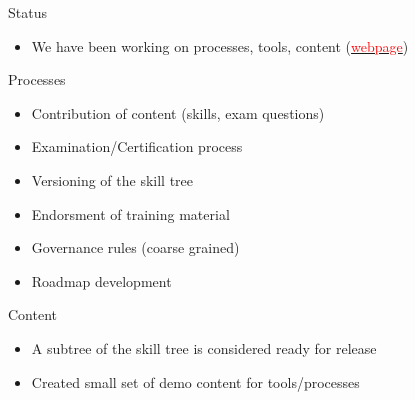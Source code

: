 \documentclass[compress,aspectratio=169]{beamer}
\newcommand{\hrefb}[2]{\href{#1}{\textcolor{red}{#2}}}
\begin{document}
\begin{frame}{Status}

  \begin{itemize}
    \item We have been working on processes, tools, content (\hrefb{https://www.hpc-certification.org/}{webpage})
  \end{itemize}


\begin{block}{Processes}
  \begin{itemize}
    \item Contribution of content (skills, exam questions)
    \item Examination/Certification process
    \item Versioning of the skill tree
    \item Endorsment of training material
    \item Governance rules (coarse grained)
    \item Roadmap development
  \end{itemize}
\end{block}


\begin{block}{Content}
	\begin{itemize}
	\item A subtree of the skill tree is considered ready for release
  \item Created small set of demo content for tools/processes
  \end{itemize}
\end{block}
\end{frame}
\end{document}
